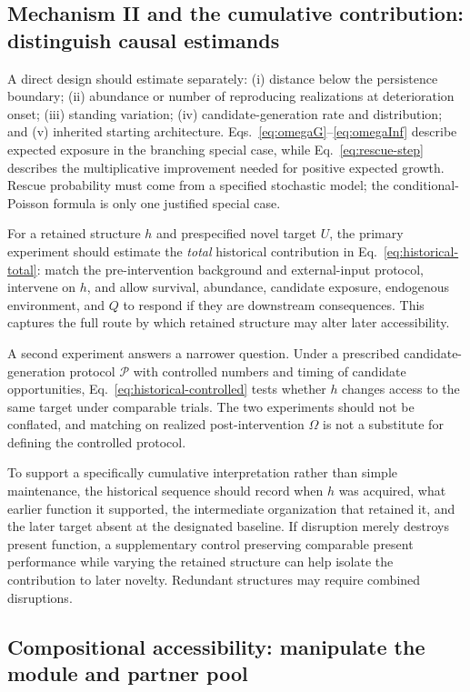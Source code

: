 \documentclass[11pt,a4paper]{article}
\begin{document}
\subsection{Mechanism II and the cumulative contribution: distinguish causal estimands}

A direct design should estimate separately: (i) distance below the persistence boundary; (ii) abundance or number of reproducing realizations at deterioration onset; (iii) standing variation; (iv) candidate-generation rate and distribution; and (v) inherited starting architecture. Eqs.~\eqref{eq:omegaG}--\eqref{eq:omegaInf} describe expected exposure in the branching special case, while Eq.~\eqref{eq:rescue-step} describes the multiplicative improvement needed for positive expected growth. Rescue probability must come from a specified stochastic model; the conditional-Poisson formula is only one justified special case.

For a retained structure $h$ and prespecified novel target $U$, the primary experiment should estimate the \emph{total} historical contribution in Eq.~\eqref{eq:historical-total}: match the pre-intervention background and external-input protocol, intervene on $h$, and allow survival, abundance, candidate exposure, endogenous environment, and $Q$ to respond if they are downstream consequences. This captures the full route by which retained structure may alter later accessibility.

A second experiment answers a narrower question. Under a prescribed candidate-generation protocol $\mathcal P$ with controlled numbers and timing of candidate opportunities, Eq.~\eqref{eq:historical-controlled} tests whether $h$ changes access to the same target under comparable trials. The two experiments should not be conflated, and matching on realized post-intervention $\Omega$ is not a substitute for defining the controlled protocol.

To support a specifically cumulative interpretation rather than simple maintenance, the historical sequence should record when $h$ was acquired, what earlier function it supported, the intermediate organization that retained it, and the later target absent at the designated baseline. If disruption merely destroys present function, a supplementary control preserving comparable present performance while varying the retained structure can help isolate the contribution to later novelty. Redundant structures may require combined disruptions.

\subsection{Compositional accessibility: manipulate the module and partner pool}
\end{document}
